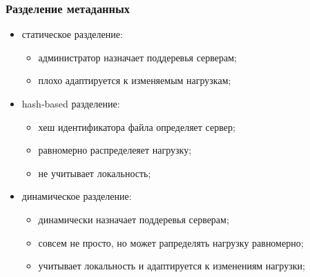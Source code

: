 \begin{frame}
\frametitle{Разделение метаданных}
\begin{itemize}
  \item<1-> статическое разделение:
    \begin{itemize}
      \item администратор назначает поддеревья серверам;
      \item плохо адаптируется к изменяемым нагрузкам;
    \end{itemize}
  \item<2-> hash-based разделение:
    \begin{itemize}
      \item хеш идентификатора файла определяет сервер;
      \item равномерно распределеяет нагрузку;
      \item не учитывает локальность;
    \end{itemize}
  \item<3-> динамическое разделение:
    \begin{itemize}
      \item динамически назначает поддеревья серверам;
      \item совсем не просто, но может рапределять нагрузку равномерно;
      \item учитывает локальность и адаптируется к изменениям нагрузки;
    \end{itemize}
\end{itemize}
\end{frame}

